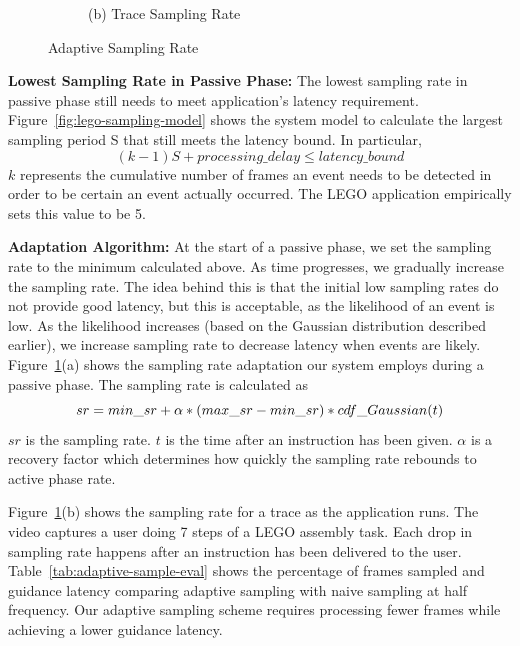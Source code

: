 \begin{figure}
\begin{subfigure}{.45\linewidth}
   {\small (b) Trace Sampling Rate}
\end{subfigure}
\caption{\small Adaptive Sampling Rate}
\label{fig:adaptive-sampling-example}
\end{figure}

\textbf{Lowest Sampling Rate in Passive Phase: }
The lowest sampling rate in passive phase still needs to meet application's
latency requirement. Figure~\ref{fig:lego-sampling-model} shows the system model
to calculate the largest sampling period S that still meets the latency bound.
In particular,
$$(k-1)S + processing\_delay \leq latency\_bound $$ $k$ represents the
cumulative number of frames an event needs to be detected in order to be
certain an event actually occurred. The LEGO application empirically sets this
value to be 5. 

\textbf{Adaptation Algorithm: }
At the start of a passive phase, we set the sampling rate to the
minimum calculated above.  As time progresses, we gradually increase
the sampling rate.  The idea behind this is that the initial low
sampling rates do not provide good latency, but this is acceptable, as
the likelihood of an event is low.  As the likelihood increases (based
on the Gaussian distribution described earlier), we increase sampling
rate to decrease latency when events are likely.
Figure~\ref{fig:adaptive-sampling-example}(a) shows the sampling rate
adaptation our system employs during a passive phase.
The sampling rate is calculated as $$sr = \\
%
 min\_sr + \alpha * (max\_sr - min\_sr) * cdf\_Gaussian(t)$$ 
%
$sr$ is the sampling rate. $t$ is the time after an instruction has been given. $\alpha$ is
a recovery factor which determines how quickly the sampling rate
rebounds to active phase rate. 


Figure~\ref{fig:adaptive-sampling-example}(b) shows the sampling rate
for a trace as the application runs. The video captures a user doing 7
steps of a LEGO assembly task. Each drop in sampling rate happens
after an instruction has been delivered to the user.
Table~\ref{tab:adaptive-sample-eval} shows the percentage of frames
sampled and guidance latency comparing adaptive sampling with naive
sampling at half frequency. Our adaptive sampling scheme requires
processing fewer frames while achieving a lower guidance latency.

